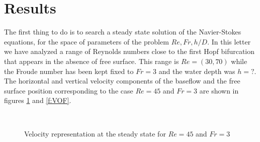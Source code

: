 \documentclass[%
 reprint,
 amsmath,amssymb,
 aps,
prl
]{revtex4-1}
\begin{document}
\section{Results}
\label{S:Results}

The first thing to do is to search a steady state solution of the Navier-Stokes equations, for the space of parameters of the problem $Re,Fr,h/D$. In this letter we have analyzed a range of Reynolds numbers close to the first Hopf bifurcation that appears in the absence of free surface. This range is $Re=(30,70)$ while the Froude number has been kept fixed to $Fr=3$ and the water depth was $h=?$. The horizontal and vertical velocity components of the baseflow and the free surface position corresponding to the case $Re=45$ and $Fr=3$ are shown in figures \ref{f:baseflow} and \ref{f:VOF}.

\begin{figure}[ht]
  \centering
     \\
   \caption{Velocity representation at the steady state for $Re=45$ and $Fr=3$}
   \label{f:baseflow}
\end{figure}
\end{document}
